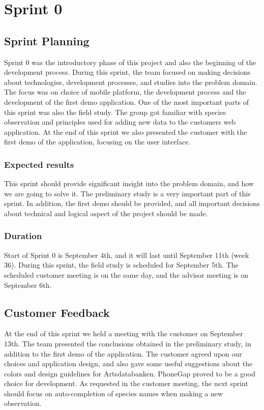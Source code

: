 \section{Sprint 0}

\subsection{Sprint Planning}
	Sprint 0 was the introductory phase of this project and also the beginning of the development process. During this sprint, the team focused on making decisions about technologies, development processes, and studies into the problem domain. The focus was on choice of mobile platform, the development process and the development of the first demo application. One of the most important parts of this sprint was also the field study. The group got familiar with species observation and principles used for adding new data to the customers web application. At the end of this sprint we also presented the customer with the first demo of the application, focusing on the user interface.
	
	\subsubsection{Expected results}
	This sprint should provide significant insight into the problem domain, and how we are going to solve it. The preliminary study is a very important part of this sprint. In addition, the first demo should be provided, and all important decisions about technical and logical aspect of the project should be made.
	
	\subsubsection{Duration}
	Start of Sprint 0 is September 4th, and it will last until September 11th (week 36). During this sprint, the field study is scheduled for September 5th. The scheduled customer meeting is on the same day, and the advisor meeting is on September 6th.
	
	
	
\subsection{Customer Feedback}
	At the end of this sprint we held a meeting with the customer on September 13th. The team presented the conclusions obtained in the preliminary study, in addition to the first demo of the application. The customer agreed upon our choices and application design, and also gave some useful suggestions about the colors and design guidelines for Artsdatabanken. PhoneGap proved to be a good choice for development.
As requested in the customer meeting, the next sprint should focus on auto-completion of species names when making a new observation.
	
